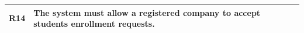 \begin{table}[H]
\begin{tabular}{|l|m{10cm}|}
        \hline \textbf{R14} & The system must allow a registered company to accept students enrollment requests. \\
        \hline
    \end{tabular}
\end{table}

